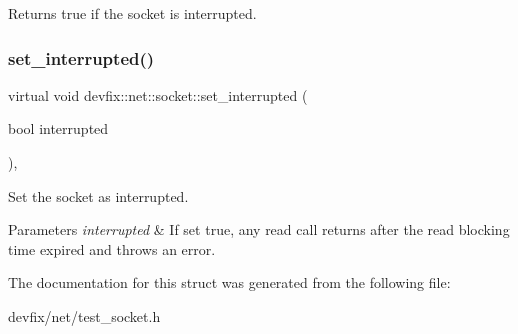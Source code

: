 \begin{DoxyReturn}{Returns}
true if the socket is interrupted. 
\end{DoxyReturn}
\mbox{\label{structdevfix_1_1net_1_1socket_a3fa8d7dcd44e7740b29ad6674005eb5d}} 
\subsubsection{\texorpdfstring{set\+\_\+interrupted()}{set\_interrupted()}}
{\footnotesize\ttfamily virtual void devfix\+::net\+::socket\+::set\+\_\+interrupted (\begin{DoxyParamCaption}\item[{bool}]{interrupted }\end{DoxyParamCaption})\hspace{0.3cm}{\ttfamily [pure virtual]}, {\ttfamily [noexcept]}}

Set the socket as interrupted. 
\begin{DoxyParams}{Parameters}
{\em interrupted} & If set true, any read call returns after the read blocking time expired and throws an error. \\
\hline
\end{DoxyParams}


The documentation for this struct was generated from the following file\+:\begin{DoxyCompactItemize}
\item 
devfix/net/test\+\_\+socket.\+h\end{DoxyCompactItemize}
